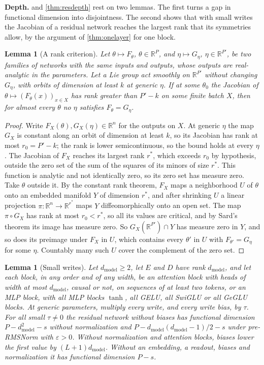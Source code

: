 \documentclass[10pt]{article}
\newtheorem{lemma}[theorem]{Lemma}
\theoremstyle{definition}
\theoremstyle{remark}
\newcommand{\R}{\mathbb{R}}
\newcommand{\dm}{d_{\mathrm{model}}}
\newcommand{\para}[1]{\smallskip\noindent\textbf{#1}\hspace{0.5em}}
\begin{document}
\para{Depth.}  and \cref{thm:resdepth} rest on two lemmas. The first turns a gap in functional dimension into disjointness. The second shows that with small writes the Jacobian of a residual network reaches the largest rank that its symmetries allow, by the argument of \cref{thm:onelayer} for one block.

\begin{lemma}[A rank criterion]\label{lem:rankcrit}
Let $\theta \mapsto F_\theta$, $\theta \in \R^P$, and $\eta \mapsto G_\eta$, $\eta \in \R^{P'}$, be two families of networks with the same inputs and outputs, whose outputs are real-analytic in the parameters. Let a Lie group act smoothly on $\R^{P'}$ without changing $G_\eta$, with orbits of dimension at least $k$ at generic $\eta$. If at some $\theta_0$ the Jacobian of $\theta \mapsto (F_\theta(x))_{x \in X}$ has rank greater than $P' - k$ on some finite batch $X$, then for almost every $\theta$ no $\eta$ satisfies $F_\theta = G_\eta$.
\end{lemma}

\begin{proof}
Write $F_X(\theta), G_X(\eta) \in \R^n$ for the outputs on $X$. At generic $\eta$ the map $G_X$ is constant along an orbit of dimension at least $k$, so its Jacobian has rank at most $r_0 = P' - k$; the rank is lower semicontinuous, so the bound holds at every $\eta$. The Jacobian of $F_X$ reaches its largest rank $r^*$, which exceeds $r_0$ by hypothesis, outside the zero set of the sum of the squares of its minors of size $r^*$. This function is analytic and not identically zero, so its zero set has measure zero. Take $\theta$ outside it. By the constant rank theorem, $F_X$ maps a neighborhood $U$ of $\theta$ onto an embedded manifold $Y$ of dimension $r^*$, and after shrinking $U$ a linear projection $\pi : \R^n \to \R^{r^*}$ maps $Y$ diffeomorphically onto an open set. The map $\pi \circ G_X$ has rank at most $r_0 < r^*$, so all its values are critical, and by Sard's theorem its image has measure zero. So $G_X(\R^{P'}) \cap Y$ has measure zero in $Y$, and so does its preimage under $F_X$ in $U$, which contains every $\theta'$ in $U$ with $F_{\theta'} = G_\eta$ for some $\eta$. Countably many such $U$ cover the complement of the zero set.
\end{proof}

\begin{lemma}[Small writes]\label{lem:smallwrites}
Let $\dm \ge 2$, let $E$ and $D$ have rank $\dm$, and let each block, in any order and of any width, be an attention block with heads of width at most $\dm$, causal or not, on sequences of at least two tokens, or an MLP block, with all MLP blocks $\tanh$, all GELU, all SwiGLU or all GeGLU blocks. At generic parameters, multiply every write, and every write bias, by $\tau$. For all small $\tau \neq 0$ the residual network without biases has functional dimension $P - \dm^2 - s$ without normalization and $P - \dm(\dm-1)/2 - s$ under pre-RMSNorm with $\varepsilon > 0$. Without normalization and attention blocks, biases lower the first value by $(L+1)\dm$. Without an embedding, a readout, biases and normalization it has functional dimension $P - s$.
\end{lemma}
\end{document}
